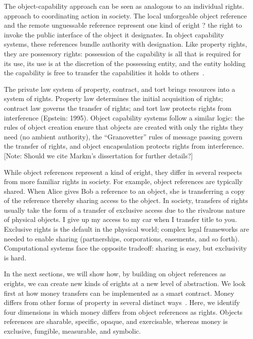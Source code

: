 \documentclass{llncs}
\begin{document}
The object-capability approach can be seen as analogous to an individual rights. approach to coordinating action in society. The local unforgeable object reference and the remote unguessable reference represent one kind of eright ? the right to invoke the public interface of the object it designates. In object capability systems, these references bundle authority with designation. Like property rights, they are possessory rights: possession of the capability is all that is required for its use, its use is at the discretion of the possessing entity, and the entity holding the capability is free to transfer the capabilities it holds to others~\cite{mossoff_what_2003}.

The private law system of property, contract, and tort brings resources into a system of rights. Property law determines the initial acquisition of rights; contract law governs the transfer of rights; and tort law protects rights from interference (Epstein: 1995). Object capability systems follow a similar logic: the rules of object creation ensure that objects are created with only the rights they need (no ambient authority), the ``Granovetter'' rules of message passing govern the transfer of rights, and object encapsulation protects rights from interference. [Note: Should we cite Markm's dissertation for further details?]

While object references represent a kind of eright, they differ in several respects from more familiar rights in society. For example, object references are typically shared. When Alice gives Bob a reference to an object, she is transferring a copy of the reference thereby sharing access to the object. In society, transfers of rights usually take the form of a transfer of exclusive access due to the rivalrous nature of physical objects. I give up my access to my car when I transfer title to you. Exclusive rights is the default in the physical world; complex legal frameworks are needed to enable sharing (partnerships, corporations, easements, and so forth). Computational systems face the opposite tradeoff: sharing is easy, but exclusivity is hard.

In the next sections, we will show how, by building on object references as erights, we can create new kinds of erights at a new level of abstraction. We look first at how money transfers can be implemented as a smart contract. Money differs from other forms of property in several distinct ways~\cite{fox_property_2008}.  Here, we identify four dimensions in which money differs from object references as rights. Objects references are sharable, specific, opaque, and exercisable, whereas money is exclusive, fungible, measurable, and symbolic.
\end{document}

